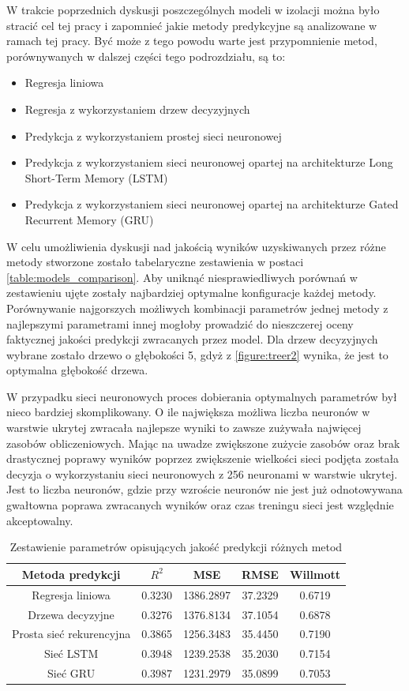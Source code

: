 \documentclass[10pt,a4paper]{article}
\begin{document}
W trakcie poprzednich dyskusji poszczególnych modeli w izolacji można było stracić cel tej pracy i zapomnieć jakie metody predykcyjne są analizowane w ramach tej pracy. Być może z tego powodu warte jest przypomnienie metod, porównywanych w dalszej części tego podrozdziału, są to:
\begin{itemize}
	\item Regresja liniowa
	\item Regresja z wykorzystaniem drzew decyzyjnych
	\item Predykcja z wykorzystaniem prostej sieci neuronowej
	\item Predykcja z wykorzystaniem sieci neuronowej opartej na architekturze Long Short-Term Memory (LSTM)
	\item Predykcja z wykorzystaniem sieci neuronowej opartej na architekturze Gated Recurrent Memory (GRU)
\end{itemize}

W celu umożliwienia dyskusji nad jakością wyników uzyskiwanych przez różne metody stworzone zostało tabelaryczne zestawienia w postaci \autoref{table:models_comparison}. Aby uniknąć niesprawiedliwych porównań w zestawieniu ujęte zostały najbardziej optymalne konfiguracje każdej metody. Porównywanie najgorszych możliwych kombinacji parametrów jednej metody z najlepszymi parametrami innej mogłoby prowadzić do nieszczerej oceny faktycznej jakości predykcji zwracanych przez model. Dla drzew decyzyjnych wybrane zostało drzewo o głębokości 5, gdyż z \autoref{figure:treer2} wynika, że jest to optymalna głębokość drzewa. 

W przypadku sieci neuronowych proces dobierania optymalnych parametrów był nieco bardziej skomplikowany. O ile największa możliwa liczba neuronów w warstwie ukrytej zwracała najlepsze wyniki to zawsze zużywała najwięcej zasobów obliczeniowych. Mając na uwadze zwiększone zużycie zasobów oraz brak drastycznej poprawy wyników poprzez zwiększenie wielkości sieci podjęta została decyzja o wykorzystaniu sieci neuronowych z 256 neuronami w warstwie ukrytej. Jest to liczba neuronów, gdzie przy wzroście neuronów nie jest już odnotowywana gwałtowna poprawa zwracanych wyników oraz czas treningu sieci jest względnie akceptowalny.


\begin{table}[h!]
	\centering
	\begin{tabular}{|c|c|c|c|c|}
		\hline
		Metoda predykcji & $R^2$ & MSE & RMSE & Willmott \\
		\hline
		Regresja liniowa & 0.3230 & 1386.2897 & 37.2329 & 0.6719 \\
		Drzewa decyzyjne & 0.3276 & 1376.8134 & 37.1054 & 0.6878\\
		Prosta sieć rekurencyjna & 0.3865  & 1256.3483 & 35.4450 & 0.7190 \\
		Sieć LSTM & 0.3948  & 1239.2538 & 35.2030 & 0.7154 \\
		Sieć GRU & 0.3987  & 1231.2979 & 35.0899 & 0.7053 \\
		\hline
	\end{tabular}
	\caption{Zestawienie parametrów opisujących jakość predykcji różnych metod}
	\label{table:models_comparison}
\end{table}
\end{document}
